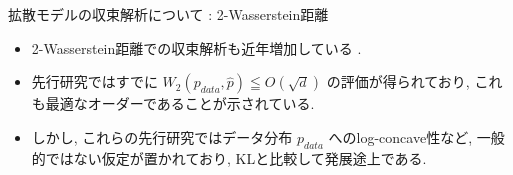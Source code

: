\documentclass[11pt]{beamer}
\theoremstyle{plain}
\theoremstyle{definition}
\renewcommand{\cite}[1]{\citep{#1}}
\begin{document}
  \begin{frame}{拡散モデルの収束解析について : 2-Wasserstein距離}
    \begin{itemize}
        \item 2-Wasserstein距離での収束解析も近年増加している\cite{arsenyan_vardanyan_dalalyan_2025, beyler_bach_2025, bruno_sabanis_2025, gao_nguyen_zhu_2025} .
        \item 先行研究ではすでに $W_2(p_{data},\hat{p})\leqq O(\sqrt{d})$ の評価が得られており, これも最適なオーダーであることが示されている.
        \item しかし, これらの先行研究ではデータ分布 $p_{data}$ へのlog-concave性など, 一般的ではない仮定が置かれており, KLと比較して発展途上である.
    \end{itemize}
  \end{frame}
\end{document}
